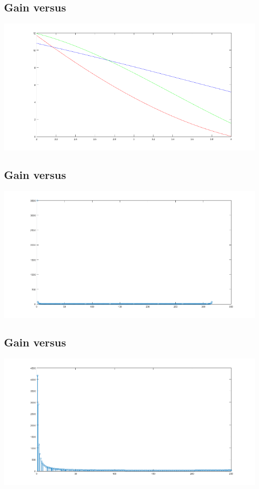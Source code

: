 \subsection*{Gain versus }
\begin{center}
    \includegraphics{linear_poly.png}
\end{center}

\subsection*{Gain versus }
\begin{center}
    \includegraphics{stem1.png}
\end{center}

\subsection*{Gain versus }
\begin{center}
    \includegraphics{stem2.png}
\end{center}

